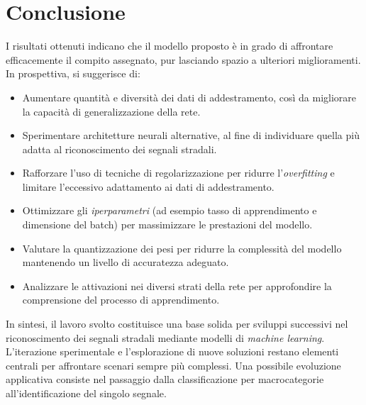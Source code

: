 \section{Conclusione}
I risultati ottenuti indicano che il modello proposto è in grado di affrontare efficacemente il compito assegnato, pur lasciando spazio a ulteriori miglioramenti. In prospettiva, si suggerisce di:
\begin{itemize}
  \item Aumentare quantità e diversità dei dati di addestramento, così da migliorare la capacità di generalizzazione della rete.
  
  \item Sperimentare architetture neurali alternative, al fine di individuare quella più adatta al riconoscimento dei segnali stradali.
  
  \item Rafforzare l'uso di tecniche di regolarizzazione per ridurre l'\textit{overfitting} e limitare l'eccessivo adattamento ai dati di addestramento.
  
  \item Ottimizzare gli \textit{iperparametri} (ad esempio tasso di apprendimento e dimensione del batch) per massimizzare le prestazioni del modello.
  
  \item Valutare la quantizzazione dei pesi per ridurre la complessità del modello mantenendo un livello di accuratezza adeguato.
  
  \item Analizzare le attivazioni nei diversi strati della rete per approfondire la comprensione del processo di apprendimento.
\end{itemize}

In sintesi, il lavoro svolto costituisce una base solida per sviluppi successivi nel riconoscimento dei segnali stradali mediante modelli di \textit{machine learning}. L'iterazione sperimentale e l'esplorazione di nuove soluzioni restano elementi centrali per affrontare scenari sempre più complessi. Una possibile evoluzione applicativa consiste nel passaggio dalla classificazione per macrocategorie all'identificazione del singolo segnale.
